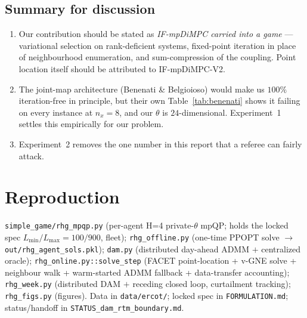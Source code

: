 \documentclass[11pt, letterpaper]{article}
\begin{document}
\subsection{Summary for discussion}
\begin{enumerate}[leftmargin=1.6em,nosep]
\item Our contribution should be stated as \emph{IF-mpDiMPC carried into a game} --- variational
selection on rank-deficient systems, fixed-point iteration in place of neighbourhood enumeration, and
sum-compression of the coupling. Point location itself should be attributed to IF-mpDiMPC-V2.
\item The joint-map architecture (Benenati \& Belgioioso) would make us $100\%$ iteration-free in
principle, but their own Table~\ref{tab:benenati} shows it failing on every instance at $n_x{=}8$,
and our $\theta$ is $24$-dimensional. Experiment~1 settles this empirically for our problem.
\item Experiment~2 removes the one number in this report that a referee can fairly attack.
\end{enumerate}

\section{Reproduction}
\texttt{simple\_game/rhg\_mpqp.py} (per-agent H=4 private-$\theta$ mpQP; holds the locked spec
$L_{\min}/L_{\max}=100/900$, fleet); \texttt{rhg\_offline.py} (one-time PPOPT solve $\to$
\texttt{out/rhg\_agent\_sols.pkl}); \texttt{dam.py} (distributed day-ahead ADMM $+$ centralized
oracle); \texttt{rhg\_online.py::solve\_step} (FACET point-location + v-GNE solve + neighbour walk +
warm-started ADMM fallback + data-transfer accounting); \texttt{rhg\_week.py} (distributed DAM $+$
receding closed loop, curtailment tracking); \texttt{rhg\_figs.py} (figures). Data in
\texttt{data/ercot/}; locked spec in \texttt{FORMULATION.md}; status/handoff in
\texttt{STATUS\_dam\_rtm\_boundary.md}.
\end{document}
